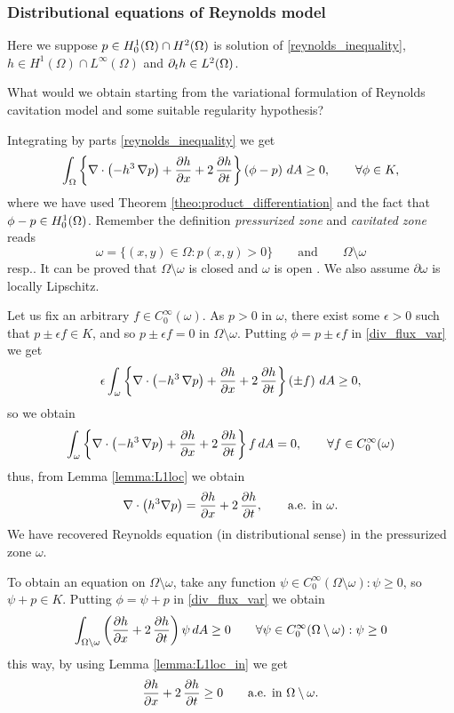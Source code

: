 \subsubsection*{Distributional equations of Reynolds model}
Here we suppose $p\in {H_0^1(\Omega)} \cap H^2(\Omega)$ is solution of \eqref{reynolds_inequality}, $h\in H^1(\Omega)\cap L^\infty(\Omega)$ and 
$\partial_t h\in{L^{2}(\Omega)}$.

What would we obtain starting from the variational formulation of Reynolds cavitation model and some suitable regularity hypothesis?

Integrating by parts \eqref{reynolds_inequality} we get
\begin{align}
\int_\Omega \left\{\nabla\cdot\left(-h^3\,\nabla p\right) +\parder{h}{x}+2\,\parder{h}{t}\right\}\left(\phi-p\right)\,dA  \geq 0,\qquad \forall \phi \in K,\label{eq:div_flux_var}
\end{align}
where we have used Theorem \ref{theo:product_differentiation} and the fact that $\phi-p\in {H_0^1(\Omega)}$. Remember the definition \emph{pressurized zone} and \emph{cavitated zone} reads $$ \omega=\{(x,y)\in \Omega:p(x,y) >0\}\qquad\text{and}\qquad \Omega\setminus \omega$$
resp.. It can be proved that $\Omega\setminus\omega$ is closed and $\omega$ is open \cite{kinderlehrer1980}. We also assume $\partial \omega$ is locally Lipschitz.

Let us fix an arbitrary $f\in C^\infty_0(\omega)$. As $p>0$ in $\omega$, there exist some $\epsilon>0$ such that $p\pm \epsilon f\in K$, and so $p\pm \epsilon f =0$ in $\Omega\setminus\omega$. Putting $\phi=p\pm\epsilon f$ in \eqref{div_flux_var} we get
\begin{equation*}
\epsilon\int_{\omega} \left\{\nabla\cdot\left(-h^3\,\nabla p\right)+\frac{\partial h}{\partial x}+2\,\frac{\partial h}{\partial t}\right\} \left(\pm f\right)\,dA  \geq 0,
\end{equation*}
so we obtain 
$$\int_{\omega} \left\{\nabla\cdot\left(-h^3\,\nabla p\right) +\frac{\partial h}{\partial x}+2\,\frac{\partial h}{\partial t}\right\}f\,dA  = 0,\qquad \forall f\in C_0^\infty (\omega)$$
thus, from Lemma \ref{lemma:L1loc} we obtain
\begin{equation}
\nabla\cdot\left(h^3\nabla p\right)=\parder{h}{x}+2\,\parder{h}{t},\qquad\text{a.e. in }\omega.\label{eq:flux_J_omegaplus}
\end{equation}
We have recovered Reynolds equation (in distributional sense) in the pressurized zone $\omega$.

To obtain an equation on $\Omega\setminus\omega$, take any function $\psi\in C^\infty_0(\Omega\setminus\omega):\psi\geq 0$, so $\psi+p\in K$. Putting $\phi=\psi+p$ in \eqref{div_flux_var} we obtain
$$\int_{\Omega\setminus\omega}\left( \frac{\partial h}{\partial x}+2\,\frac{\partial h}{\partial t}\right) \psi \,dA\geq 0\qquad \forall \psi \in C^\infty_0(\Omega\setminus\omega):\psi\geq 0$$
this way, by using Lemma \ref{lemma:L1loc_in} we get
\begin{equation}
\parder{h}{x}+2\,\parder{h}{t}\geq 0\qquad \text{a.e. in }\Omega\setminus\omega \label{eq:flux_J_omega0}.
\end{equation}

